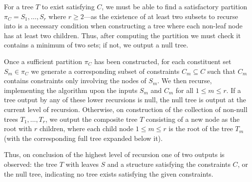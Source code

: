 \documentclass[a4paper, 11pt]{article}
\begin{document}
	For a tree $T$ to exist satisfying $C$, we must be able to find a satisfactory partition $\pi_{C} = S_{1}, \ldots, S_{r}$ where $r \geq 2$---as the existence of at least two subsets to recurse into is a necessary condition when constructing a tree where each non-leaf node has at least two children. Thus, after computing the partition we must check it contains a minimum of two sets; if not, we output a null tree.

	Once a sufficient partition $\pi_{C}$ has been constructed, for each constituent set $S_{m} \in \pi_{C}$ we generate a corresponding subset of constraints $C_{m} \subseteq C$ such that $C_{m}$ contains constraints only involving the nodes of $S_{m}$. We then recurse, implementing the algorithm upon the inputs $S_{m}$ and $C_{m}$ for all $1 \leq m \leq r$. If a tree output by any of these lower recursions is null, the null tree is output at the current level of recursion. Otherwise, on construction of the collection of non-null trees $T_{1}, \ldots, T_{r}$, we output the composite tree $T$ consisting of a new node as the root with $r$ children, where each child node $1 \leq m \leq r$ is the root of the tree $T_{m}$ (with the corresponding full tree expanded below it).
	
	Thus, on conclusion of the highest level of recursion one of two outputs is observed: the tree $T$ with leaves $S$ and a structure satisfying the constraints $C$, or the null tree, indicating no tree exists satisfying the given constraints.

	
\end{document}

